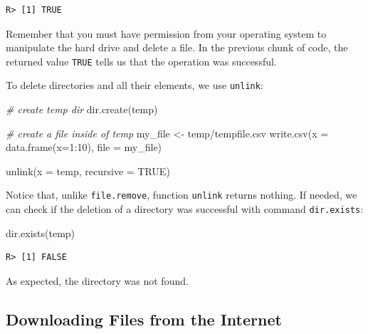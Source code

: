 \documentclass[
  12pt,
]{book}
\newenvironment{Shaded}{\begin{snugshade}}{\end{snugshade}}
\newcommand{\AttributeTok}[1]{\textcolor[rgb]{0.61,0.61,0.61}{#1}}
\newcommand{\CommentTok}[1]{\textcolor[rgb]{0.37,0.37,0.37}{\textit{#1}}}
\newcommand{\ConstantTok}[1]{\textcolor[rgb]{0,0,0}{#1}}
\newcommand{\DecValTok}[1]{\textcolor[rgb]{0.06,0.06,0.06}{#1}}
\newcommand{\FunctionTok}[1]{\textcolor[rgb]{0,0,0}{#1}}
\newcommand{\NormalTok}[1]{#1}
\newcommand{\OtherTok}[1]{\textcolor[rgb]{0.37,0.37,0.37}{#1}}
\newcommand{\SpecialCharTok}[1]{\textcolor[rgb]{0,0,0}{#1}}
\newcommand{\StringTok}[1]{\textcolor[rgb]{0.5,0.5,0.5}{#1}}
\begin{document}
\begin{verbatim}
R> [1] TRUE
\end{verbatim}

Remember that you must have permission from your operating system to manipulate the hard drive and delete a file. In the previous chunk of code, the returned value \texttt{TRUE} tells us that the operation was successful.

To delete directories and all their elements, we use \texttt{unlink}:

\begin{Shaded}
\begin{Highlighting}[]
\CommentTok{\# create temp dir}
\FunctionTok{dir.create}\NormalTok{(}\StringTok{\textquotesingle{}temp\textquotesingle{}}\NormalTok{)}

\CommentTok{\# create a file inside of temp}
\NormalTok{my\_file }\OtherTok{\textless{}{-}} \StringTok{\textquotesingle{}temp/tempfile.csv\textquotesingle{}}
\FunctionTok{write.csv}\NormalTok{(}\AttributeTok{x =} \FunctionTok{data.frame}\NormalTok{(}\AttributeTok{x=}\DecValTok{1}\SpecialCharTok{:}\DecValTok{10}\NormalTok{),}
          \AttributeTok{file =}\NormalTok{ my\_file)}

\FunctionTok{unlink}\NormalTok{(}\AttributeTok{x =} \StringTok{\textquotesingle{}temp\textquotesingle{}}\NormalTok{, }\AttributeTok{recursive =} \ConstantTok{TRUE}\NormalTok{)}
\end{Highlighting}
\end{Shaded}

Notice that, unlike \texttt{file.remove}, function \texttt{unlink} returns nothing. If needed, we can check if the deletion of a directory was successful with command \texttt{dir.exists}:

\begin{Shaded}
\begin{Highlighting}[]
\FunctionTok{dir.exists}\NormalTok{(}\StringTok{\textquotesingle{}temp\textquotesingle{}}\NormalTok{)}
\end{Highlighting}
\end{Shaded}

\begin{verbatim}
R> [1] FALSE
\end{verbatim}

As expected, the directory was not found.

\hypertarget{downloading-files-from-the-internet}{%
\subsection{Downloading Files from the Internet}\label{downloading-files-from-the-internet}}
\end{document}
